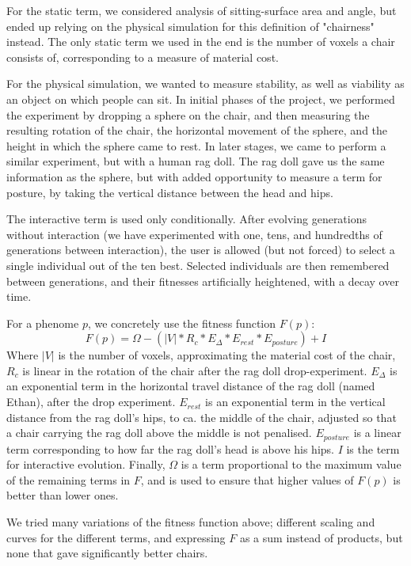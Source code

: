 For the static term, we considered analysis of sitting-surface area and angle,
but ended up relying on the physical simulation for this definition of
"chairness" instead. The only static term we used in the end is the number of
voxels a chair consists of, corresponding to a measure of material cost.

For the physical simulation, we wanted to measure stability, as well as
viability as an object on which people can sit. In initial phases of the
project, we performed the experiment by dropping a sphere on the chair, and then
measuring the resulting rotation of the chair, the horizontal movement of the
sphere, and the height in which the sphere came to rest. In later stages, we
came to perform a similar experiment, but with a human rag doll. The rag doll
gave us the same information as the sphere, but with added opportunity to
measure a term for posture, by taking the vertical distance between the head and
hips.

The interactive term is used only conditionally. After evolving generations
without interaction (we have experimented with one, tens, and hundredths of
generations between interaction), the user is allowed (but not forced) to select
a single individual out of the ten best. Selected individuals are then
remembered between generations, and their fitnesses artificially heightened,
with a decay over time.

For a phenome $p$, we concretely use the fitness function $F(p)$:
$$F(p) = \Omega - (\left|V\right| * R_c * E_{\Delta} * E_{rest} * E_{posture})
+ I$$
Where $|V|$ is the number of voxels, approximating the material cost of the
chair, $R_c$ is linear in the rotation of the chair after the rag doll
drop-experiment. $E_{\Delta}$ is an exponential term in the horizontal travel
distance of the rag doll (named Ethan), after the drop experiment. $E_{rest}$ is
an exponential term in the vertical distance from the rag doll's hips, to ca.
the middle of the chair, adjusted so that a chair carrying the rag doll above
the middle is not penalised. $E_{posture}$ is a linear term corresponding to how
far the rag doll's head is above his hips. $I$ is the term for
interactive evolution. Finally, $\Omega$ is a term proportional to the maximum
value of the remaining terms in $F$, and is used to ensure that higher values of
$F(p)$ is better than lower ones.

We tried many variations of the fitness function above; different scaling and
curves for the different terms, and expressing $F$ as a sum instead of
products, but none that gave significantly better chairs.

